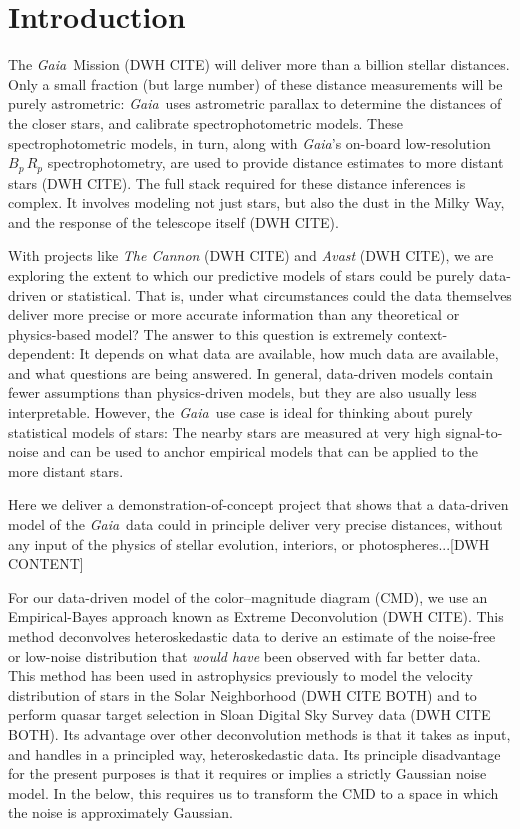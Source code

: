 \documentclass[12pt, preprint]{aastex6}
\newcommand{\project}[1]{\textsl{#1}}
\newcommand{\gaia}{\project{Gaia}}
\begin{document}

\section{Introduction}

The \gaia\ Mission (DWH CITE) will deliver more than a billion stellar distances.
Only a small fraction (but large number) of these distance
measurements will be purely astrometric:
\gaia\ uses astrometric parallax to determine the distances of the closer
stars, and calibrate spectrophotometric models.
These spectrophotometric models, in turn, along with \gaia's on-board
low-resolution $B_p\,R_p$ spectrophotometry, are used to provide
distance estimates to more distant stars (DWH CITE).
The full stack required for these distance inferences is complex.
It involves modeling not just stars, but also the dust in the Milky Way,
and the response of the telescope itself (DWH CITE).

With projects like \project{The Cannon} (DWH CITE) and \project{Avast}
(DWH CITE), we are exploring the extent to which our predictive models of
stars could be purely data-driven or statistical.
That is, under what circumstances could the data themselves deliver
more precise or more accurate information than any theoretical or
physics-based model?
The answer to this question is extremely context-dependent: It depends
on what data are available, how much data are available, and what
questions are being answered.
In general, data-driven models contain fewer assumptions than
physics-driven models, but they are also usually less interpretable.
However, the \gaia\ use case is ideal for thinking about purely statistical
models of stars:
The nearby stars are measured at very high signal-to-noise and can be
used to anchor empirical models that can be applied to the more
distant stars.

Here we deliver a demonstration-of-concept project that shows that a
data-driven model of the \gaia\ data could in principle deliver very
precise distances, without any input of the physics of stellar
evolution, interiors, or photospheres...[DWH CONTENT]

For our data-driven model of the color--magnitude diagram (CMD), we use
an Empirical-Bayes approach known as Extreme Deconvolution (DWH CITE).
This method deconvolves heteroskedastic data to derive an estimate
of the noise-free or low-noise distribution that \emph{would have}
been observed with far better data.
This method has been used in astrophysics
previously to model the velocity distribution of stars in the Solar
Neighborhood (DWH CITE BOTH) and to perform quasar target selection
in Sloan Digital Sky Survey data (DWH CITE BOTH).
Its advantage over other deconvolution methods is that it takes as input,
and handles in a principled way, heteroskedastic data.
Its principle disadvantage for the present purposes is that it requires
or implies a strictly Gaussian noise model.
In the below, this requires us to transform the CMD to a space in which
the noise is approximately Gaussian.
\end{document}
